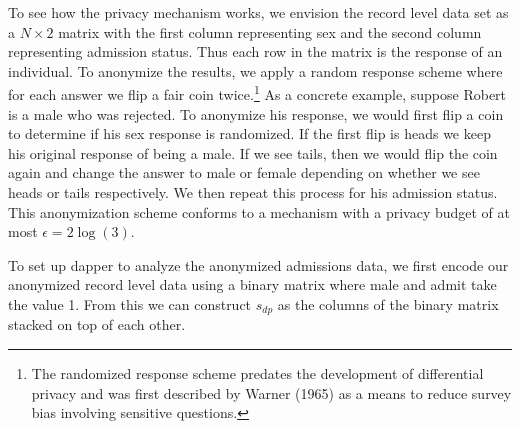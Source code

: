 To see how the privacy mechanism works, we envision the record level data set as a \(N \times 2\) matrix with
the first column representing sex and the second column representing
admission status. Thus each row in the matrix is the response of an
individual. To anonymize the results, we apply a random response scheme
where for each answer we flip a fair coin twice.\footnote{The randomized response scheme predates the development of differential privacy and was first described by Warner (1965) as a means to reduce survey bias involving sensitive questions.} As a concrete example,
suppose Robert is a male who was rejected. To anonymize his response,
we would first flip a coin to determine if his sex response is randomized. If
the first flip is heads we keep his original response of being a male. If we see tails,
then we would flip the coin again and change the answer to male or female depending
on whether we see heads or tails respectively. We then repeat this process for
his admission status. This anonymization scheme conforms to a mechanism with
a privacy budget of at most \(\epsilon = 2\log(3)\).

To set up dapper to analyze the anonymized admissions data, we first encode our anonymized record level data using
a binary matrix where male and admit take the value 1. From this
we can construct \(s_{dp}\) as the columns of the binary
matrix stacked on top of each other.


